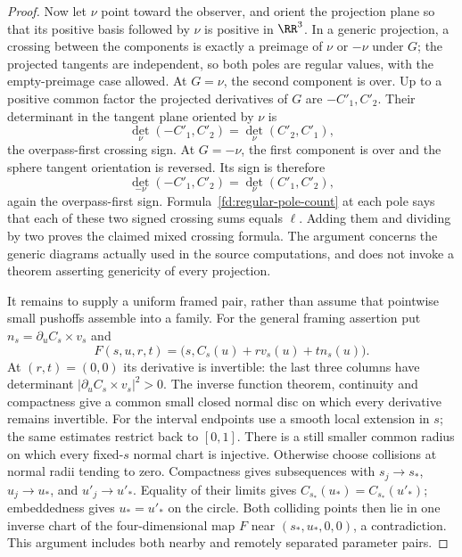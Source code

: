\begin{proof}
Now let $\nu$ point toward the observer, and orient the projection
plane so that its positive basis followed by $\nu$ is positive in
$\RR^3$. In a generic projection, a crossing between the components
is exactly a preimage of $\nu$ or $-\nu$ under $G$; the projected
tangents are independent, so both poles are regular values, with
the empty-preimage case allowed. At $G=\nu$, the second component
is over. Up to a positive common factor the projected derivatives
of $G$ are $-C'_1,C'_2$. Their determinant in the tangent plane
oriented by $\nu$ is
\begin{equation}
       \det_\nu(-C'_1,C'_2)=\det_\nu(C'_2,C'_1),
\end{equation}
the overpass-first crossing sign. At $G=-\nu$, the first component
is over and the sphere tangent orientation is reversed. Its sign is
therefore
\begin{equation}
       \det_{-\nu}(-C'_1,C'_2)=\det_\nu(C'_1,C'_2),
\end{equation}
again the overpass-first sign. Formula~\eqref{fd:regular-pole-count}
at each pole says that each of these two signed crossing sums equals
$\ell$. Adding them and dividing by two proves the claimed mixed
crossing formula. The argument concerns the generic diagrams actually
used in the source computations, and does not invoke a theorem asserting
genericity of every projection.

It remains to supply a uniform framed pair, rather than assume that
pointwise small pushoffs assemble into a family. For the general
framing assertion put $n_s=\partial_uC_s\times v_s$ and
\begin{equation}\label{fd:family-normal-chart}
 F(s,u,r,t)=\bigl(s,C_s(u)+r v_s(u)+t n_s(u)\bigr).
\end{equation}
At $(r,t)=(0,0)$ its derivative is invertible: the last three
columns have determinant $|\partial_uC_s\times v_s|^2>0$.
The inverse function theorem, continuity and compactness give a
common small closed normal disc on which every derivative remains
invertible. For the interval endpoints use a smooth local extension
in $s$; the same estimates restrict back to $[0,1]$.
There is a still smaller common radius on which every fixed-$s$
normal chart is injective. Otherwise choose collisions at normal
radii tending to zero. Compactness gives subsequences with
$s_j\to s_*$, $u_j\to u_*$, and $u'_j\to u'_*$.
Equality of their limits gives $C_{s_*}(u_*)=C_{s_*}(u'_*)$;
embeddedness gives $u_*=u'_*$ on the circle. Both colliding points
then lie in one inverse chart of the four-dimensional map $F$
near $(s_*,u_*,0,0)$, a contradiction. This argument includes
both nearby and remotely separated parameter pairs.


\end{proof}
